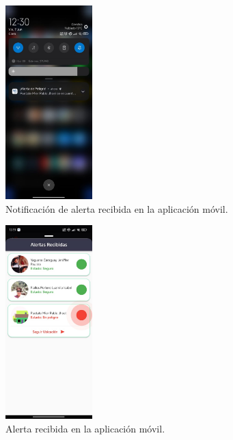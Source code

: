 \begin{figure}[H]
    \centering
    \includegraphics[width=0.3\textwidth]{chapters/III-resultados-y-discusion/resources/images/notificacion-recibida-movil.png}
    \caption{Notificación de alerta recibida en la aplicación móvil.}
    \label{fig:notificacion-recibida-movil}
\end{figure}

\begin{figure}[H]
    \centering
    \includegraphics[width=0.3\textwidth]{chapters/III-resultados-y-discusion/resources/images/alerta-recibida-movil.png}
    \caption{Alerta recibida en la aplicación móvil.}
    \label{fig:alerta-recibida-movil}
\end{figure}


